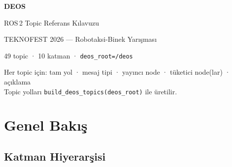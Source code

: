 \documentclass[11pt,a4paper]{article}
\begin{document}
\begin{titlepage}
  \centering
  \vspace*{3.5cm}
  {\Huge\bfseries DEOS\par}
  \vspace{0.4cm}
  {\Large ROS\,2 Topic Referans Kılavuzu\par}
  \vspace{1.2cm}
  {\large TEKNOFEST 2026 — Robotaksi-Binek Yarışması\par}
  \vspace{0.5cm}
  {\normalsize 49 topic · 10 katman · \texttt{deos\_root=/deos}\par}
  \vfill
  {\small\color{gray}
    Her topic için: tam yol · mesaj tipi · yayıncı node · tüketici node(lar) · açıklama\\[4pt]
    Topic yolları \texttt{build\_deos\_topics(deos\_root)} ile üretilir.}
\end{titlepage}

\tableofcontents
\newpage

\section{Genel Bakış}

\subsection{Katman Hiyerarşisi}
\end{document}
